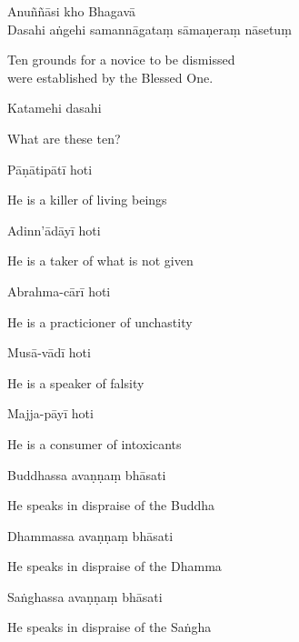 
Anuññāsi kho Bhagavā\\
Dasahi aṅgehi samannāgataṃ sāmaṇeraṃ nāsetuṃ

\begin{english}
  Ten grounds for a novice to be dismissed\\
  were established by the Blessed One.
\end{english}

\clearpage

Katamehi dasahi

\begin{english}
  What are these ten?
\end{english}

Pāṇātipātī hoti

\begin{english}
  He is a killer of living beings
\end{english}

Adinn'ādāyī hoti

\begin{english}
  He is a taker of what is not given
\end{english}

Abrahma-cārī hoti

\begin{english}
  He is a practicioner of unchastity
\end{english}

Musā-vādī hoti

\begin{english}
  He is a speaker of falsity
\end{english}

Majja-pāyī hoti

\begin{english}
  He is a consumer of intoxicants
\end{english}

Buddhassa avaṇṇaṃ bhāsati

\begin{english}
  He speaks in dispraise of the Buddha
\end{english}

Dhammassa avaṇṇaṃ bhāsati

\begin{english}
  He speaks in dispraise of the Dhamma
\end{english}

Saṅghassa avaṇṇaṃ bhāsati

\begin{english}
  He speaks in dispraise of the Saṅgha
\end{english}

